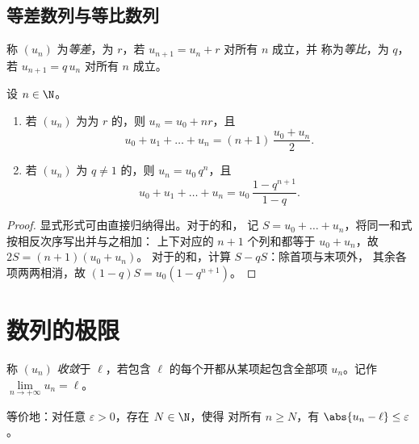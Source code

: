 \subsection{等差数列与等比数列}

\begin{definition}[等差数列与等比数列]\label{def:g12:seq:arith-geom}
称 $(u_n)$ 为\emph{等差}，为 $r$，若
$u_{n+1} = u_n + r$ 对所有 $n$ 成立，并
称为\emph{等比}，为 $q$，若
$u_{n+1} = q\,u_n$ 对所有 $n$ 成立。
\end{definition}

\begin{proposition}[通项公式与求和]\label{prop:g12:seq:arith-geom}
设 $n \in \N$。
\begin{enumerate}
  \item 若 $(u_n)$ 为为 $r$ 的，则
        $u_n = u_0 + nr$，且
        \[
        u_0 + u_1 + \dots + u_n = (n+1)\,\frac{u_0 + u_n}{2}.
        \]
  \item 若 $(u_n)$ 为 $q \neq 1$ 的，则
        $u_n = u_0\, q^n$，且
        \[
        u_0 + u_1 + \dots + u_n = u_0\,\frac{1 - q^{n+1}}{1 - q}.
        \]
\end{enumerate}
\end{proposition}

\begin{proof}
显式形式可由直接归纳得出。对于的和，
记 $S = u_0 + \dots + u_n$，将同一和式按相反次序写出并与之相加：
上下对应的 $n+1$ 个列和都等于 $u_0 + u_n$，故 $2S = (n+1)(u_0+u_n)$。
对于的和，计算 $S - qS$：除首项与末项外，
其余各项两两相消，故 $(1-q)S = u_0(1 - q^{n+1})$。
\end{proof}

\section{数列的极限}

\begin{definition}[收敛数列]\label{def:g12:seq:limit}
称 $(u_n)$ \emph{收敛}于
$\ell$，若包含 $\ell$ 的每个开都从某项起包含全部项
$u_n$。记作 $\lim\limits_{n\to+\infty} u_n = \ell$。

等价地：对任意 $\varepsilon > 0$，存在 $N \in \N$，使得
对所有 $n \geq N$，有 $\abs{u_n - \ell} \leq \varepsilon$。
\end{definition}

